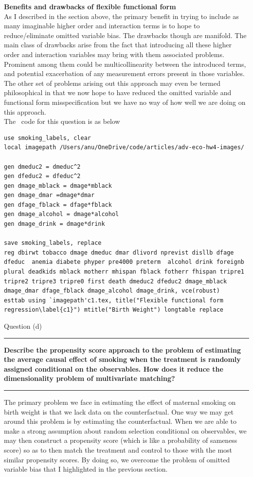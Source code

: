 \documentclass[12pt]{article}
\newcommand\question[1]{\vspace{1em}\hrule\vspace{1em}\textbf{#1}\vspace{1em}\hrule\vspace{1em}}
\begin{document}
\textbf{Benefits and drawbacks of flexible functional form}\\
As I described in the section above, the primary benefit in trying to include as many imaginable higher order and interaction terms is to hope to reduce/eliminate omitted variable bias. The drawbacks though are manifold. The main class of drawbacks arise from the fact that introducing all these higher order and interaction variables may bring with them associated problems. Prominent among them could be multicollinearity between the introduced terms, and potential exacerbation of any measurement errors present in those variables. The other set of problems arising out this approach may even be termed philosophical in that we now hope to have reduced the omitted variable and functional form misspecification but we have no way of how well we are doing on this approach.\\
The \stata \ code   for this question is as below
\begin{lstlisting}
use smoking_labels, clear
local imagepath /Users/anu/OneDrive/code/articles/adv-eco-hw4-images/

gen dmeduc2 = dmeduc^2
gen dfeduc2 = dfeduc^2
gen dmage_mblack = dmage*mblack
gen dmage_dmar =dmage*dmar
gen dfage_fblack = dfage*fblack
gen dmage_alcohol = dmage*alcohol
gen dmage_drink = dmage*drink

save smoking_labels, replace
reg dbirwt tobacco dmage dmeduc dmar dlivord nprevist disllb dfage dfeduc  anemia diabete phyper pre4000 preterm  alcohol drink foreignb plural deadkids mblack motherr mhispan fblack fotherr fhispan tripre1 tripre2 tripre3 tripre0 first death dmeduc2 dfeduc2 dmage_mblack dmage_dmar dfage_fblack dmage_alcohol dmage_drink, vce(robust)
esttab using `imagepath'c1.tex, title("Flexible functional form regression\label{c1}") mtitle("Birth Weight") longtable replace
\end{lstlisting}

\newpage
\begin{center}\LARGE{Question (d)}\end{center}
\question{Describe the propensity score approach to the problem of estimating the average causal effect of smoking when the treatment is randomly assigned conditional on the observables.  How does it reduce the dimensionality problem of multivariate matching?}

The primary problem we face in estimating the effect of maternal smoking on birth weight is that we lack data on the counterfactual. One way we may get around this problem is by estimating the counterfactual. When we are able to make a strong assumption about random selection conditional on observables, we may then construct a propensity score (which is like a probability of sameness score) so as to then match the treatment and control to those with the most similar propensity scores. By doing so, we overcome the problem of omitted variable bias that I highlighted in the previous section. 
\end{document}
